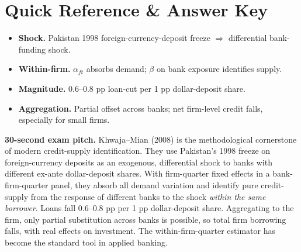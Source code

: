\documentclass[11pt]{article}
\begin{document}
\section*{Quick Reference \& Answer Key}
\begin{answerbox}
\begin{itemize}
\item \textbf{Shock.} Pakistan 1998 foreign-currency-deposit freeze $\Rightarrow$ differential bank-funding shock.
\item \textbf{Within-firm.} $\alpha_{ft}$ absorbs demand; $\beta$ on bank exposure identifies supply.
\item \textbf{Magnitude.} 0.6--0.8 pp loan-cut per 1 pp dollar-deposit share.
\item \textbf{Aggregation.} Partial offset across banks; net firm-level credit falls, especially for small firms.
\end{itemize}
\end{answerbox}

\begin{keybox}
\textbf{30-second exam pitch.} Khwaja--Mian (2008) is the methodological cornerstone of modern credit-supply identification. They use Pakistan's 1998 freeze on foreign-currency deposits as an exogenous, differential shock to banks with different ex-ante dollar-deposit shares. With firm-quarter fixed effects in a bank-firm-quarter panel, they absorb all demand variation and identify pure credit-supply from the response of different banks to the shock \emph{within the same borrower}. Loans fall 0.6--0.8 pp per 1 pp dollar-deposit share. Aggregating to the firm, only partial substitution across banks is possible, so total firm borrowing falls, with real effects on investment. The within-firm-quarter estimator has become the standard tool in applied banking.
\end{keybox}
\end{document}
